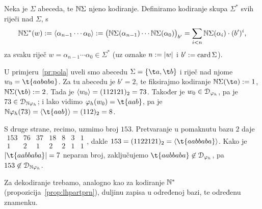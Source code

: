 \begin{definicija}[{name=[kodiranje riječi]}]
Neka je $\Sigma$ abeceda, te ${\mathbb N}\Sigma$ njeno kodiranje. Definiramo kodiranje skupa $\Sigma^*$ svih riječi nad $\Sigma$, s
\begin{equation}\label{eq:kodNSz}
    {\mathbb N}\Sigma^*(w):=\langle\alpha_{n-1}\dotsm\alpha_0\rangle:=\bigl({\mathbb N}\Sigma(\alpha_{n-1})\dotsm{\mathbb N}\Sigma(\alpha_0)\bigr)_{b'}=\sum_{i<n}{\mathbb N}\Sigma(\alpha_i)\cdot(b')^i\text,
\end{equation}
za svaku riječ $w=\alpha_{n-1}\dotsm\alpha_0\in\Sigma^*$ (uz oznake $n:=\lvert w\rvert$ i $b':=\operatorname{card}\Sigma$).
\end{definicija}

\begin{primjer}[{name=[prateća funkcija jezične funkcije]}]
U primjeru~\ref{pr:pola} uveli smo abecedu $\Sigma=\{\t a,\t b\}$ i riječ nad njome $w_0=\t{aababa}$. Za tu abecedu je $b'=2$, te fiksirajmo kodiranje $\N\Sigma(\t a):=1$, $\N\Sigma(\t b):=2$. Tada je $\langle w_0\rangle=(112121)_2=73$.
Također je $w_0\in\mathcal D_{\varphi_h}$, pa je $73\in\mathcal D_{{\mathbb N}\varphi_h}$; i lako vidimo $\varphi_h(w_0)=\t{aab}$, pa je
$\N\varphi_h(73)=\kr{\t{aab}}=(112)_2=8$.

S druge strane, recimo, uzmimo broj $153$. Pretvaranje u pomaknutu bazu $2$ daje
$\begin{array}{rrrrrrr}
153 & 76 & 37 & 18 & 8 & 3 & 1\\\hline
1 & 2 & 1 & 2 & 2 & 1 & 1
\end{array}$, dakle $153=(1122121)_2=\kr{\t{aabbaba}}$. Kako je $\dulj{\t{aabbaba}}=7$ neparan broj, zaključujemo $\t{aabbaba}\not\in\dom{\varphi_h}$, pa $153\not\in\mathcal D_{{\mathbb N}\varphi_h}$.
\end{primjer}

Za dekodiranje trebamo, analogno kao za kodiranje ${\mathbb N}^*$ (propozicija~\ref{prop:lhpartprn}), duljinu zapisa u određenoj bazi, te određenu znamenku. %


